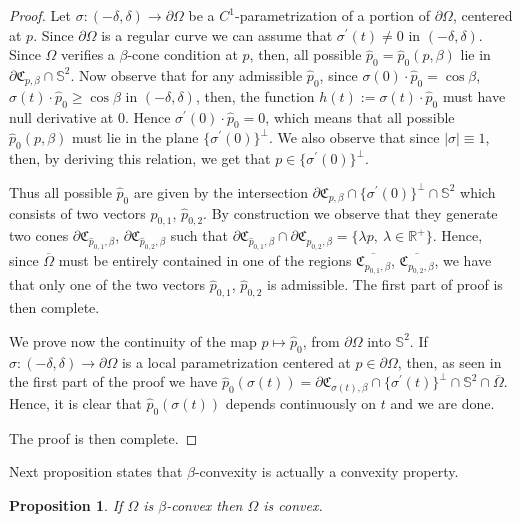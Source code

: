 \documentclass[a4paper,reqno,10pt,oneside]{amsart}
\numberwithin{equation}{section}
\newtheorem{proposition}[theorem]{Proposition}
\begin{document}
\begin{proof}
Let $\sigma:(-\delta,\delta) \to \partial \Omega$ be a $C^1$-parametrization of a portion of $\partial \Omega$, centered at $p$. Since $\partial \Omega$ is a regular curve we can assume that $\sigma^\prime(t) \neq 0$ in $(-\delta,\delta)$. Since $\Omega$ verifies a $\beta$-cone condition at $p$, then, all possible $\hat p_0=\hat p_0(p,\beta)$ lie in $\partial\mathfrak{C}_{p, \beta}\cap \mathbb{S}^2$. Now observe that for any admissible $\hat p_0$, since $\sigma(0) \cdot \hat p_0= \cos \beta$, $\sigma(t) \cdot \hat p_0 \geq \cos \beta$ in $(-\delta,\delta)$, then, the function $h(t):=\sigma(t) \cdot \hat p_0$ must have null derivative at $0$. Hence $\sigma^\prime(0) \cdot \hat p_0=0$, which means that all possible $\hat p_0(p,\beta)$ must lie in the plane $\{\sigma^\prime(0)\}^\perp$. We also observe that since $|\sigma|\equiv 1$, then, by deriving this relation, we get that $p \in \{\sigma^\prime(0)\}^\perp$.

Thus all possible $\hat p_0$ are given by the intersection $\partial\mathfrak{C}_{p, \beta} \cap \{\sigma^\prime(0)\}^\perp \cap \mathbb{S}^2$ which consists of two vectors $\hat p_{0,1}$, $\hat p_{0,2}$. By construction we observe that they generate two cones $\partial\mathfrak{C}_{\hat p_{0,1}, \beta}$, $\partial\mathfrak{C}_{\hat p_{0,2}, \beta}$ such that $\partial\mathfrak{C}_{\hat p_{0,1}, \beta} \cap \partial\mathfrak{C}_{\hat p_{0,2}, \beta}=\{\lambda p,\ \lambda \in {\mathbb R}^+ \}$. Hence, since $\overline\Omega$ must be entirely contained in one of the regions $\overline{\mathfrak{C}_{p_{0,1}, \beta}}$, $\overline{\mathfrak{C}_{p_{0,2}, \beta}}$, we have that only one of the two vectors $\hat p_{0,1}$, $\hat p_{0,2}$ is admissible. The first part of proof is then complete.

We prove now the continuity of  the map $p\mapsto \hat p_0$, from $\partial \Omega$ into $\mathbb{S}^2$.  If $\sigma:(-\delta,\delta)\to\partial \Omega$ is a local parametrization centered at $p \in \partial \Omega$, then, as seen in the first part of the proof we have $\hat p_0(\sigma(t))= \partial\mathfrak{C}_{\sigma(t), \beta} \cap \{\sigma^\prime(t)\}^\perp \cap \mathbb{S}^2\cap \overline \Omega$. Hence, it is clear that $\hat p_0(\sigma(t))$ depends continuously on $t$ and we are done.

The proof is then complete.
\end{proof}

Next proposition states that $\beta$-convexity is actually a convexity property. 
\begin{proposition}
If $\Omega$ is $\beta$-convex then $\Omega$ is convex.
\end{proposition}
\end{document}
